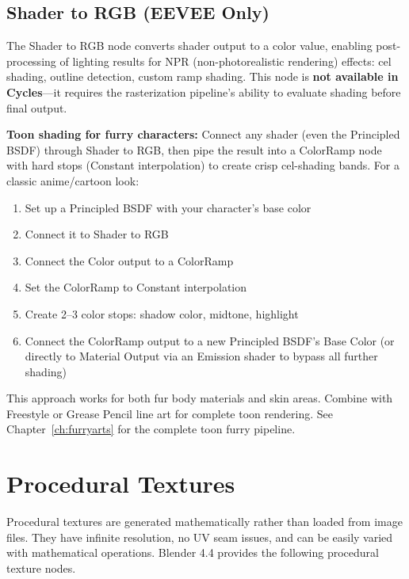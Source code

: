 \subsection{Shader to RGB (EEVEE Only)}

The Shader to RGB node converts shader output to a color value,
enabling post-processing of lighting results for NPR
(non-photorealistic rendering) effects: cel shading, outline
detection, custom ramp shading. This node is \textbf{not available
in Cycles}---it requires the rasterization pipeline's ability to
evaluate shading before final output.

\begin{furrybox}
\textbf{Toon shading for furry characters:} Connect any shader
(even the Principled BSDF) through Shader to RGB, then pipe the
result into a ColorRamp node with hard stops (Constant
interpolation) to create crisp cel-shading bands. For a
classic anime/cartoon look:
\begin{enumerate}[leftmargin=2em]
  \item Set up a Principled BSDF with your character's base color
  \item Connect it to Shader to RGB
  \item Connect the Color output to a ColorRamp
  \item Set the ColorRamp to Constant interpolation
  \item Create 2--3 color stops: shadow color, midtone, highlight
  \item Connect the ColorRamp output to a new Principled BSDF's
        Base Color (or directly to Material Output via an Emission
        shader to bypass all further shading)
\end{enumerate}
This approach works for both fur body materials and skin areas.
Combine with Freestyle or Grease Pencil line art for complete toon
rendering. See Chapter~\ref{ch:furryarts} for the complete toon
furry pipeline.
\end{furrybox}


\section{Procedural Textures}
\label{sec:shading:procedural}

Procedural textures are generated mathematically rather than loaded
from image files. They have infinite resolution, no UV seam issues,
and can be easily varied with mathematical operations. Blender 4.4
provides the following procedural texture nodes.

